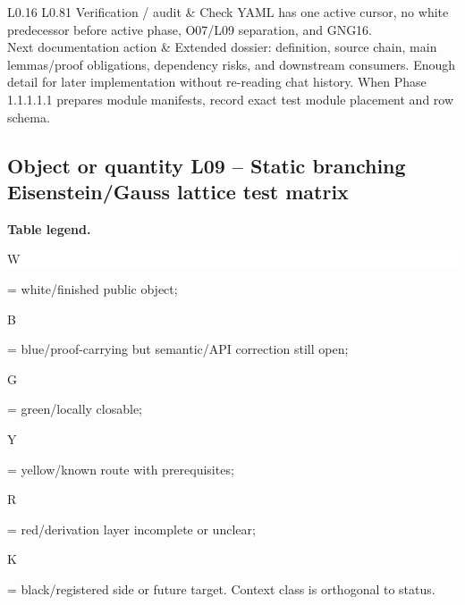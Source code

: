 \begin{longtable}{L{0.16\linewidth} L{0.81\linewidth}}
\hline\addlinespace[0.20em]
Verification /\allowbreak{} audit & Check YAML has one active cursor, no white predecessor before active phase, O07/\allowbreak{}L09 separation, and GNG16.\\
\hline\addlinespace[0.20em]
Next documentation action & Extended dossier: definition, source chain, main lemmas/\allowbreak{}proof obligations, dependency risks, and downstream consumers. Enough detail for later implementation without re-reading chat history. When Phase 1.1.1.1.1 prepares module manifests, record exact test module placement and row schema.\\
\hline\addlinespace[0.20em]
\end{longtable}
\subsection*{Object or quantity L09 -- Static branching Eisenstein/\allowbreak{}Gauss lattice test matrix}
\hypertarget{objproof:L09}{}
\par\smallskip\noindent\begin{minipage}{0.99\linewidth}\footnotesize\raggedright\textbf{Table legend.} \colorbox{white}{\strut W} = white/finished public object; \colorbox{cyan!20}{\strut B} = blue/proof-carrying but semantic/API correction still open; \colorbox{green!18}{\strut G} = green/locally closable; \colorbox{yellow!25}{\strut Y} = yellow/known route with prerequisites; \colorbox{red!20}{\strut R} = red/derivation layer incomplete or unclear; \colorbox{black!18}{\strut K} = black/registered side or future target. Context class is orthogonal to status.\end{minipage}\par\vspace{0.25em}
